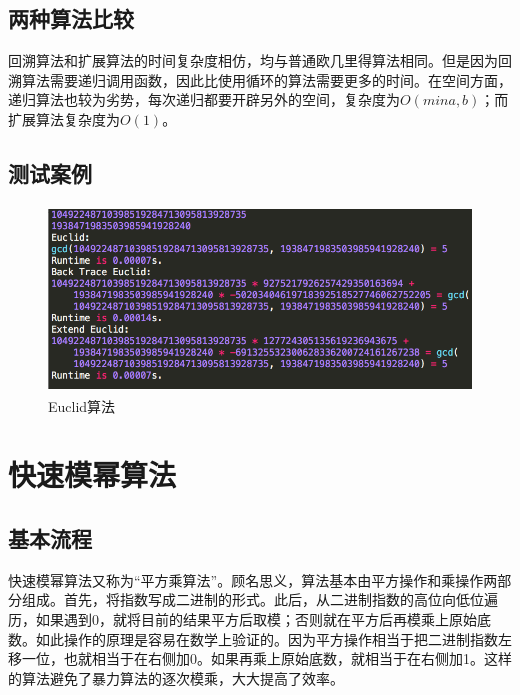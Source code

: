 \documentclass[11pt]{ctexart}
\begin{document}
\subsection{两种算法比较}
回溯算法和扩展算法的时间复杂度相仿，均与普通欧几里得算法相同。但是因为回溯算法需要递归调用函数，因此比使用循环的算法需要更多的时间。在空间方面，递归算法也较为劣势，每次递归都要开辟另外的空间，复杂度为$O(min{a, b})$；而扩展算法复杂度为$O(1)$。
\newpage{}
\subsection{测试案例}
\begin{figure}[htbp]
\centering
\includegraphics[height=4.93cm,width=11.65cm]{Euclid.png}
\caption{Euclid算法}
\label{img_Euclid}
\end{figure}

\section{快速模幂算法}

\subsection{基本流程}
快速模幂算法又称为“平方乘算法”。顾名思义，算法基本由平方操作和乘操作两部分组成。首先，将指数写成二进制的形式。此后，从二进制指数的高位向低位遍历，如果遇到0，就将目前的结果平方后取模；否则就在平方后再模乘上原始底数。如此操作的原理是容易在数学上验证的。因为平方操作相当于把二进制指数左移一位，也就相当于在右侧加0。如果再乘上原始底数，就相当于在右侧加1。这样的算法避免了暴力算法的逐次模乘，大大提高了效率。
\end{document}
